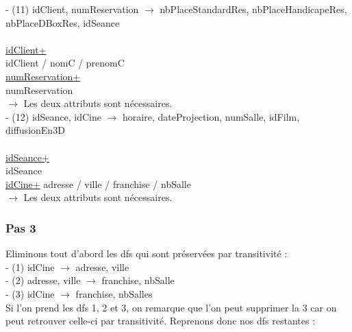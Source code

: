 \documentclass[a4paper,sffamily,12pt]{article}
\begin{document}
				\noindent - (11) idClient, numReservation $\rightarrow$ nbPlaceStandardRes, nbPlaceHandicapeRes, nbPlaceDBoxRes, idSeance \\
					\\
					\underline{idClient+} \\
					idClient / nomC / prenomC \\
					\underline{numReservation+} \\
					numReservation \\	
				$\rightarrow$ Les deux attributs sont nécessaires. \\					
				
				\noindent - (12) idSeance, idCine $\rightarrow$ horaire, dateProjection, numSalle, idFilm, diffusionEn3D \\												
					\\
					\underline{idSeance+}\\
					idSeance \\
					\underline{idCine+}
					adresse / ville / franchise / nbSalle \\
				$\rightarrow$ Les deux attributs sont nécessaires. \\

				\vspace{0.5cm}

			\subsubsection{Pas 3}		
	
				\vspace{0.5cm}
	
				\noindent Eliminons tout d'abord les dfs qui sont préservées par transitivité : \\
	
					\noindent- (1) idCine $\rightarrow$ adresse, ville \\
					- (2) adresse, ville $\rightarrow$ franchise, nbSalle \\
					- (3) idCine $\rightarrow$ franchise, nbSalles \\
					
				Si l'on prend les dfs 1, 2 et 3, on remarque que l'on peut supprimer la 3 car on peut retrouver celle-ci par transitivité. Reprenons donc nos dfs restantes : \\
					
\end{document}
